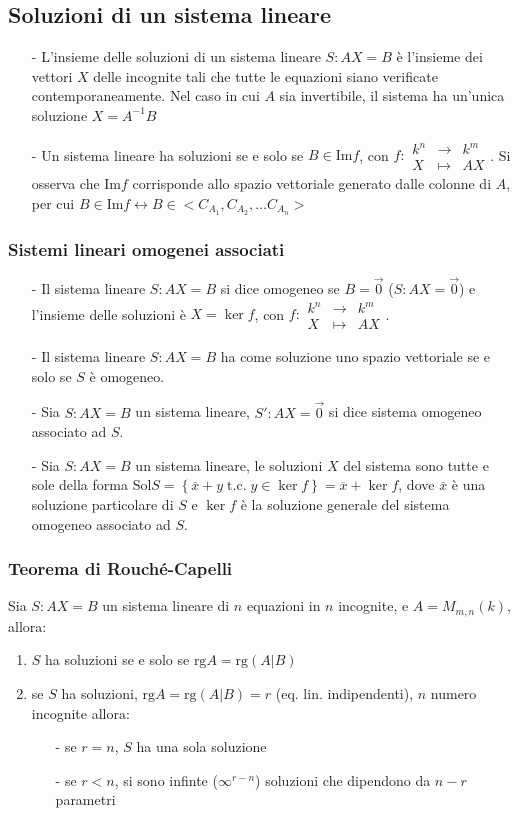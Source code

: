 \documentclass[a4paper]{article}
\newcommand\f[4]{\begin{smallmatrix} {#1} &\to &{#2} \\ {#3} &\mapsto &{#4} \end{smallmatrix}}
\newcommand\tc{\;\text{t.c.}\;} %
\newcommand\img{\text{Im}}		%
\newcommand\rg{\text{rg}} 		%
\newcommand\sol{\text{Sol}}		%
\begin{document}
\subsection{Soluzioni di un sistema lineare}
\begin{itemize}
	\item[-] L'insieme delle soluzioni di un sistema lineare \(S : AX = B\) è l'insieme dei vettori \(X\) delle incognite tali che
	tutte le equazioni siano verificate contemporaneamente. Nel caso in cui \(A\) sia invertibile, il sistema ha un'unica soluzione
	\(X = A^{-1} B\)
	\item[-] Un sistema lineare ha soluzioni se e solo se \(B \in \img f\), con \(f: \f{k^n}{k^m}{X}{AX}\). Si osserva che \(\img f\)
	corrisponde allo spazio vettoriale generato dalle colonne di \(A\), per cui \(B \in \img f \leftrightarrow B \in <C_{A_1}, C_{A_2}, \dots C_{A_n}>\) 
\end{itemize}

\subsubsection*{Sistemi lineari omogenei associati}
\begin{itemize}
	\item[-] Il sistema lineare \(S: AX = B\) si dice omogeneo se \(B = \vec{0}\) (\(S:AX = \vec{0}\)) e l'insieme delle soluzioni
	è \(X = \ker f\), con \(f: \f{k^n}{k^m}{X}{AX}\).
	\item[-] Il sistema lineare \(S: AX = B\) ha come soluzione uno spazio vettoriale se e solo se \(S\) è omogeneo.
	\item[-] Sia \(S: AX = B\) un sistema lineare, \(S' : AX = \vec{0}\) si dice sistema omogeneo associato ad \(S\).
	\item[-] Sia \(S: AX = B\) un sistema lineare, le soluzioni \(X\) del sistema sono tutte e sole della forma
	\(\sol S = \left\{ \overline{x} + y \tc y \in \ker f \right\} = \overline{x} + \ker f\), dove \(\overline{x}\) è una soluzione
	particolare di \(S\) e \(\ker f\) è la soluzione generale del sistema omogeneo associato ad \(S\).
\end{itemize}

\subsubsection*{Teorema di Rouché-Capelli}
Sia \(S: AX = B\) un sistema lineare di \(n\) equazioni in \(n\) incognite, e \(A = M_{m,n}(k)\), allora:
\begin{enumerate}
	\item \(S\) ha soluzioni se e solo se \(\rg A = \rg (A|B)\)
	\item se \(S\) ha soluzioni, \(\rg A = \rg (A|B) = r\) (eq. lin. indipendenti), \(n\) numero incognite allora:
	\begin{itemize}
		\item[-] se \(r = n\), \(S\) ha una sola soluzione
		\item[-] se \(r < n\), si sono infinte (\(\infty^{r-n}\)) soluzioni che dipendono da \(n-r\) parametri
	\end{itemize}
\end{enumerate}
\end{document}
